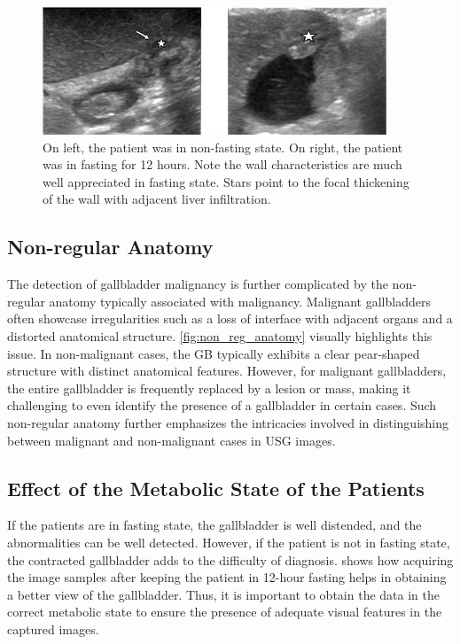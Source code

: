 \begin{figure}[t]
    \centering
    \includegraphics[width=0.8\linewidth]{figs/fasting.png}
    \caption[Effect of metabolic state on GB distension]{On left, the patient was in non-fasting state. On right, the patient was in fasting for 12 hours. Note the wall characteristics are much well appreciated in fasting state. Stars point to the focal thickening of the wall with adjacent liver infiltration. }
    \label{fig:fasting}
\end{figure}

\subsection{Non-regular Anatomy}
%

The detection of gallbladder malignancy is further complicated by the non-regular anatomy typically associated with malignancy. Malignant gallbladders often showcase irregularities such as a loss of interface with adjacent organs and a distorted anatomical structure. \cref{fig:non_reg_anatomy} visually highlights this issue. In non-malignant cases, the GB typically exhibits a clear pear-shaped structure with distinct anatomical features. However, for malignant gallbladders, the entire gallbladder is frequently replaced by a lesion or mass, making it challenging to even identify the presence of a gallbladder in certain cases. Such non-regular anatomy further emphasizes the intricacies involved in distinguishing between malignant and non-malignant cases in USG images.

\subsection{Effect of the Metabolic State of the Patients}
%
If the patients are in fasting state, the gallbladder is well distended, and the abnormalities can be well detected. However, if the patient is not in fasting state, the contracted gallbladder adds to the difficulty of diagnosis.  shows how acquiring the image samples after keeping the patient in 12-hour fasting helps in obtaining a better view of the gallbladder. Thus, it is important to obtain the data in the correct metabolic state to ensure the presence of adequate visual features in the captured images.

